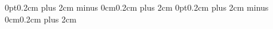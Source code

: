 \documentclass[11pt]{paper}
\author{Tamas Spisak}
\date{2020}
\title{\mytitle} %
\begin{document}
    \titlespacing*{\section}
    {0pt}{0.2cm plus 2cm minus 0cm}{0.2cm plus 2cm}
    \titlespacing*{\subsection}
    {0pt}{0.2cm plus 2cm minus 0cm}{0.2cm plus 2cm}

    \frontpage
    
    
    \setcounter{page}{2}

    \begin{large}
    
    
    
        
    \end{large}

    
    \footnotesize
    {\linespread{0}\selectfont}
\end{document}
